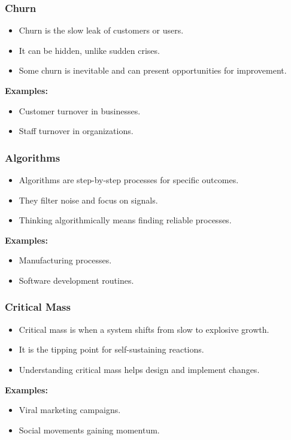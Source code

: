 \begin{frame}[fragile]\frametitle{Churn}
\begin{itemize}
    \item Churn is the slow leak of customers or users.
    \item It can be hidden, unlike sudden crises.
    \item Some churn is inevitable and can present opportunities for improvement.
\end{itemize}
\textbf{Examples:}
\begin{itemize}
    \item Customer turnover in businesses.
    \item Staff turnover in organizations.
\end{itemize}
\end{frame}

\begin{frame}[fragile]\frametitle{Algorithms}
\begin{itemize}
    \item Algorithms are step-by-step processes for specific outcomes.
    \item They filter noise and focus on signals.
    \item Thinking algorithmically means finding reliable processes.
\end{itemize}
\textbf{Examples:}
\begin{itemize}
    \item Manufacturing processes.
    \item Software development routines.
\end{itemize}
\end{frame}

\begin{frame}[fragile]\frametitle{Critical Mass}
\begin{itemize}
    \item Critical mass is when a system shifts from slow to explosive growth.
    \item It is the tipping point for self-sustaining reactions.
    \item Understanding critical mass helps design and implement changes.
\end{itemize}
\textbf{Examples:}
\begin{itemize}
    \item Viral marketing campaigns.
    \item Social movements gaining momentum.
\end{itemize}
\end{frame}

